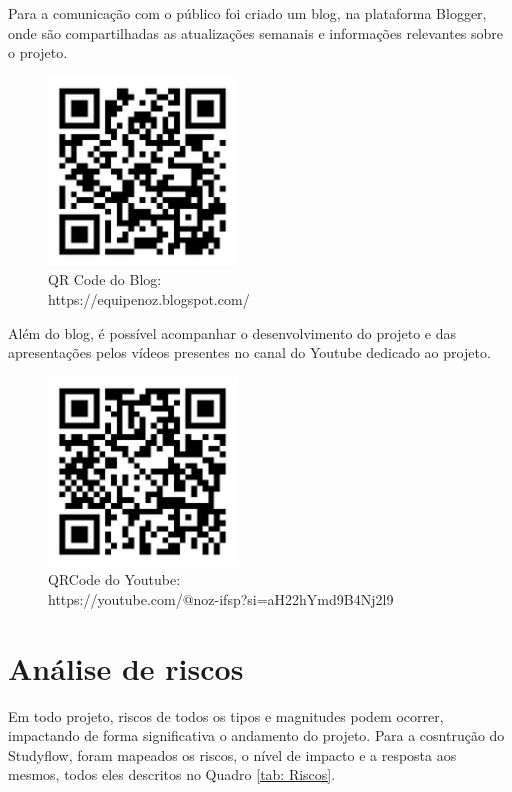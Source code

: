 Para a comunicação com o público foi criado um blog, na plataforma Blogger, onde são compartilhadas as atualizações semanais e informações relevantes sobre o projeto.

 \begin{figure}[!htb]
 	    \centering
 	    \caption{\label{logo}QR Code do Blog: \\ https://equipenoz.blogspot.com/}
 	    \includegraphics[width=5cm]{img/qrcode-blog.png}
\end{figure}
\FloatBarrier

Além do blog, é possível acompanhar o desenvolvimento do projeto e das apresentações pelos vídeos presentes no canal do Youtube dedicado ao projeto.

 \begin{figure}[!htb]
 	    \centering
 	    \caption{\centering\label{logo}QRCode do Youtube: \\ https://youtube.com/@noz-ifsp?si=aH22hYmd9B4Nj2l9}
 	    \includegraphics[width=5cm]{img/qrcode-youtube.png}
\end{figure}
\FloatBarrier

\section{Análise de riscos}

Em todo projeto, riscos de todos os tipos e magnitudes podem ocorrer, impactando de forma significativa o andamento do projeto. 
Para a cosntrução do Studyflow, foram mapeados os riscos, o nível de impacto e a resposta aos mesmos, todos eles descritos no Quadro \ref{tab: Riscos}.

